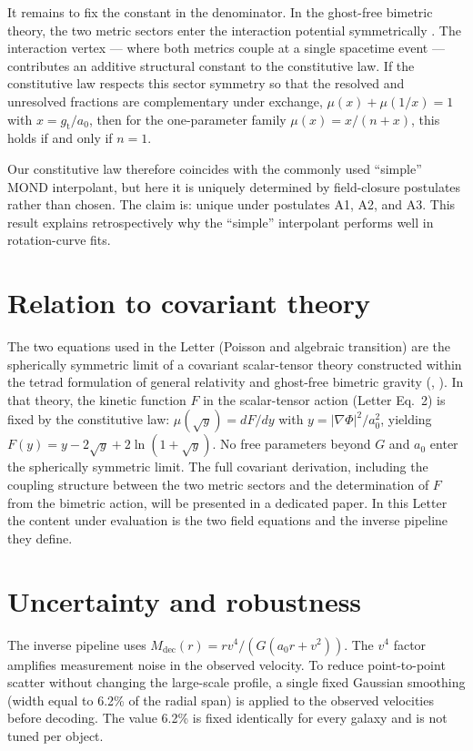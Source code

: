\documentclass[aps,amsmath,amssymb,reprint,nofootinbib]{revtex4-2}
\begin{document}
It remains to fix the constant in the denominator. In the ghost-free bimetric theory, the two metric sectors enter the interaction potential symmetrically \cite{hassan2012}. The interaction vertex --- where both metrics couple at a single spacetime event --- contributes an additive structural constant to the constitutive law. If the constitutive law respects this sector symmetry so that the resolved and unresolved fractions are complementary under exchange, $\mu(x) + \mu(1/x) = 1$ with $x = g_{\mathrm{t}}/a_0$, then for the one-parameter family $\mu(x) = x/(n+x)$, this holds if and only if $n = 1$.

Our constitutive law therefore coincides with the commonly used ``simple'' MOND interpolant, but here it is uniquely determined by field-closure postulates rather than chosen. The claim is: unique under postulates A1, A2, and A3. This result explains retrospectively why the ``simple'' interpolant performs well in rotation-curve fits.

\section{Relation to covariant theory}
\label{sec:limit}

The two equations used in the Letter (Poisson and algebraic transition) are the spherically symmetric limit of a covariant scalar-tensor theory constructed within the tetrad formulation of general relativity and ghost-free bimetric gravity (\cite{mtw1973,wald1984}, \cite{hassan2012}). In that theory, the kinetic function $F$ in the scalar-tensor action (Letter Eq.\ 2) is fixed by the constitutive law: $\mu(\sqrt{y}) = dF/dy$ with $y = |\nabla\Phi|^2/a_0^2$, yielding $F(y) = y - 2\sqrt{y} + 2\ln(1+\sqrt{y})$. No free parameters beyond $G$ and $a_0$ enter the spherically symmetric limit. The full covariant derivation, including the coupling structure between the two metric sectors and the determination of $F$ from the bimetric action, will be presented in a dedicated paper. In this Letter the content under evaluation is the two field equations and the inverse pipeline they define.

\section{Uncertainty and robustness}
\label{sec:robustness}

The inverse pipeline uses $M_{\mathrm{dec}}(r) = r v^4 / (G(a_0 r + v^2))$. The $v^4$ factor amplifies measurement noise in the observed velocity. To reduce point-to-point scatter without changing the large-scale profile, a single fixed Gaussian smoothing (width equal to 6.2\% of the radial span) is applied to the observed velocities before decoding. The value 6.2\% is fixed identically for every galaxy and is not tuned per object.
\end{document}
